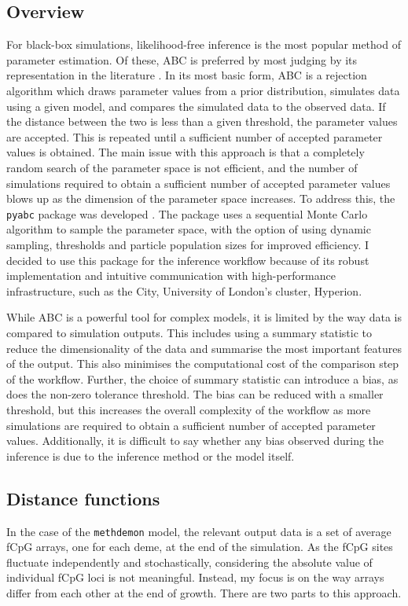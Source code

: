 \subsection{Overview}
For black-box simulations, likelihood-free inference is the most popular method
of parameter estimation. Of these, ABC is preferred by most judging by its
representation in the literature \cite{tavare_inferring_1997,
lechevallier_integrating_2010, sottoriva_big_2015, wang_calibration_2024,
bondi_approximate_2023}. In its most basic form, ABC is a rejection algorithm
which draws parameter values from a prior distribution, simulates data using a
given model, and compares the simulated data to the observed data. If the
distance between the two is less than a given threshold, the parameter values
are accepted. This is repeated until a sufficient number of accepted parameter
values is obtained. The main issue with this approach is that a completely
random search of the parameter space is not efficient, and the number of
simulations required to obtain a sufficient number of accepted parameter values
blows up as the dimension of the parameter space increases. To address this,
the \texttt{pyabc} package was developed \cite{klinger_pyabc_2018,
schalte_pyabc_2022}. The package uses a sequential Monte Carlo algorithm to
sample the parameter space, with the option of using dynamic sampling,
thresholds and particle population sizes for improved efficiency. I decided to
use this package for the inference workflow because of its robust
implementation and intuitive communication with high-performance
infrastructure, such as the City, University of London's cluster, Hyperion.\par
While ABC is a powerful tool for complex models, it is limited by the way data
is compared to simulation outputs. This includes using a summary statistic to
reduce the dimensionality of the data and summarise the most important features
of the output. This also minimises the computational cost of the comparison
step of the workflow. Further, the choice of summary statistic can introduce a
bias, as does the non-zero tolerance threshold. The bias can be reduced with a
smaller threshold, but this increases the overall complexity of the workflow as
more simulations are required to obtain a sufficient number of accepted
parameter values. Additionally, it is difficult to say whether any bias
observed during the inference is due to the inference method or the model
itself.

\subsection{Distance functions}
In the case of the \texttt{methdemon} model, the relevant output data is a set
of average fCpG arrays, one for each deme, at the end of the simulation. As the
fCpG sites fluctuate independently and stochastically, considering the absolute
value of individual fCpG loci is not meaningful. Instead, my focus is on the
way arrays differ from each other at the end of growth. There are two parts to
this approach.

